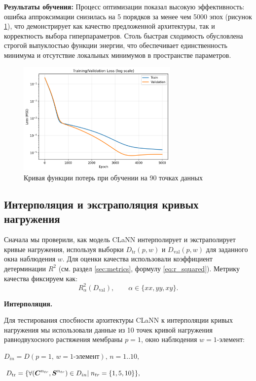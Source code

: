 \textbf{Результаты обучения:}
Процесс оптимизации показал высокую эффективность: ошибка аппроксимации снизилась на 5 порядков за менее чем 5000 эпох (рисунок \ref{fig:loss_curve}), 
что демонстрирует как качество предложенной архитектуры, так и корректность выбора гиперпараметров. 
Столь быстрая сходимость обусловлена строгой выпуклостью функции энергии, что обеспечивает единственность 
минимума и отсутствие локальных минимумов в пространстве параметров.

\begin{figure}[H]
  \centering
  \includegraphics[width=0.7\textwidth]{img/loss_curve.png}
  \caption{Кривая функции потерь при обучении на 90 точках данных}
  \label{fig:loss_curve}
\end{figure}


\subsection{Интерполяция и экстраполяция кривых нагружения}
  Сначала мы проверили, как модель CLaNN интерполирует и экстраполирует кривые нагружения, используя выборки
  $D_{\mathrm{tr}}(p,w)$ и $D_{\mathrm{val}}(p,w)$ для заданного окна наблюдения $w$.
  Для оценки качества использовали коэффициент детерминации $R^2$ (см. раздел \ref{sec:metrics}, формулу \eqref{eq:r_squared}). Метрику качества фиксируем как:
\[
  R^2_{\alpha}(D_{\mathrm{val}}),\qquad \alpha\in\{xx,yy,xy\}.
\]

  \textbf{Интерполяция.}  

  Для тестирования спосбности архитектуры CLaNN к интерполяции кривых нагружения мы использовали данные из 
  10 точек кривой нагружения равнодвухосного растяжения мембраны $p=1$, 
  окно наблюдения $w=\text{1-элемент}$:
  
  $D_{in} = D(p{=}1,\,w{=}\text{1-элемент}),\, n = 1..10,$
  
  $D_{\mathrm{tr}}=\{\forall (\boldsymbol{C}^{n_{tr}}, \boldsymbol{S}^{n_{tr}}) \in D_{in}|\; n_{tr}=\{1,5,10\}\},$
  

